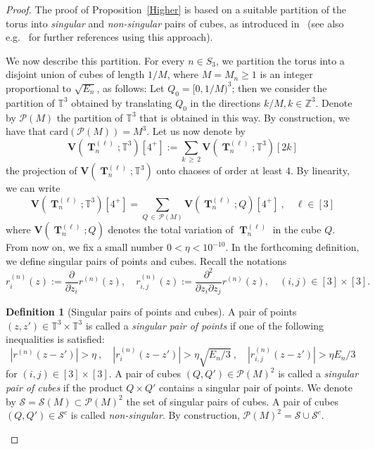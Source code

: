 \documentclass[10pt]{amsart}
\theoremstyle{definition}\newtheorem{defi}[theo]{Definition}\newtheorem{rema}[theo]{Remark}\newtheorem{exam}[theo]{Example}\newtheorem{exem}[theo]{Example}\newtheorem{nota}[theo]{Notation}
\DeclareMathOperator{\bT}{\mathbf{T}}
\newcommand{\bfv}{\mathbf{V}}
\newcommand{\clP}{\mathcal{P}}
\newcommand{\clS}{\mathcal{S}}
\newcommand{\Z}{\mathbb{Z}}
\newcommand{\T}{\mathbb{T}^3}
\begin{document}
\begin{proof}
The proof of Proposition~\ref{Higher} is based on a suitable partition of the torus into \emph{singular} and \emph{non-singular} pairs of cubes, as introduced in~\cite{ORW08} (see also e.g.~\cite{DNPR16,Not20,PR16} for further references using this approach).


We now describe this partition. For every $n \in S_3$, we partition the torus into a disjoint union of cubes of length $1/M$, where $M=M_n\geq1$ is an integer proportional to $\sqrt{E_n}$, as follows: Let $Q_0 = [0,1/M)^3$; then we consider the partition of $\T$ obtained by translating $Q_0$ in the directions $k/M,k \in \Z^3$. Denote by $\clP(M)$ the partition of $\T$ that is obtained in this way. By construction, we have that $\textrm{card}({\clP(M)})=M^3$. Let us now denote by
\[
\bfv\left(\bT_n^{(\ell)};\T\right)\left[4^+\right]:= \sum_{k\,\geq\,2} \bfv\left(\bT_n^{(\ell)};\T\right)[2k]
\]
the projection of $\bfv(\bT_n^{(\ell)};\T)$ onto chaoses of order at least $4$. By linearity, we can write
\begin{equation}\label{decomp}
\bfv\left(\bT_n^{(\ell)};\T\right)\left[4^+\right] = \sum_{Q\,\in \,\clP(M)} \bfv\left(\bT_n^{(\ell)};Q\right)\left[4^+\right] \ , \quad \ell \in [3]
\end{equation}
where $ \bfv(\bT_n^{(\ell)};Q)$ denotes the total variation of $\bT_n^{(\ell)}$ in the cube $Q$. From now on, we fix a small number $0 < \eta < 10^{- 10}$. In the forthcoming definition, we define singular pairs of points and cubes. Recall the notations
\[
r_i^{(n)}(z):= \frac{\partial}{\partial z_i} r^{(n)}(z), \quad r^{(n)}_{i,j}(z):= \frac{\partial^2}{\partial z_i \partial z_j}r^{(n)}(z), \quad (i,j)\in [3]\times [3].
\]
\begin{defi}[Singular pairs of points and cubes]\label{DefSing}
A pair of points $(z,z') \in \T \times \T $ is called a \emph{singular pair of points} if one of the following inequalities is satisfied:
\begin{equation*}
\left|r^{(n)}(z-z')\right| > \eta \ , \quad \left| r^{(n)}_i(z-z')\right| > \eta \sqrt{E_n/3} \ , \quad \left| r^{(n)}_{i,j} (z-z')\right| > \eta E_n/3
\end{equation*}
for $(i, j) \in [3]\times[3]$. A pair of cubes $(Q, Q') \in \clP(M)^2 $ is called a \emph{singular pair of cubes} if the product $Q\times Q'$ contains a singular pair of points. We denote by $\clS=\clS(M) \subset \clP(M)^2$ the set of singular pairs of cubes. A pair of cubes $(Q,Q') \in \clS^c$ is called \emph{non-singular}. By construction, $\clP(M)^2 = \clS \cup \clS^c$.
\end{defi}


\end{proof}
\end{document}
